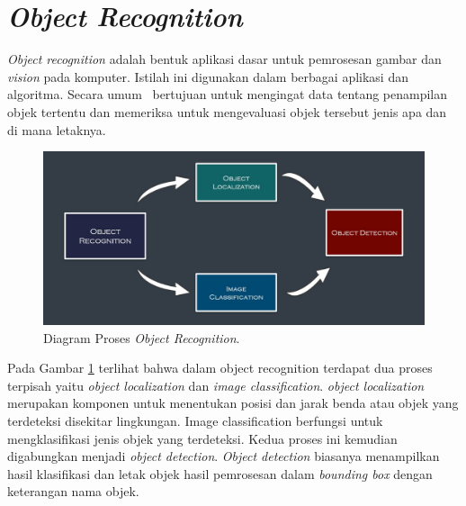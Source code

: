 
\section{\textit{Object Recognition}}
\label{sec:object_detection} 

\textit{Object recognition} adalah bentuk aplikasi dasar untuk pemrosesan gambar dan \textit{vision} pada komputer. Istilah ini digunakan dalam berbagai aplikasi dan algoritma. Secara umum \objd\ bertujuan untuk mengingat data tentang penampilan objek tertentu dan memeriksa untuk mengevaluasi objek tersebut jenis apa dan di mana letaknya. 

\begin{figure}[H]
            \centering
            \includegraphics[scale=0.3]{Object_Rec.jpeg}
            \caption{Diagram Proses \textit{Object Recognition}.}
            \label{fig:Ch02_objectR}
        \end{figure}

Pada Gambar \ref{fig:Ch02_objectR} terlihat bahwa dalam object recognition terdapat dua proses terpisah yaitu \textit{object localization} dan \textit{image classification}. \textit{object localization} merupakan komponen untuk menentukan posisi dan jarak benda atau objek yang terdeteksi disekitar lingkungan. Image classification berfungsi untuk mengklasifikasi jenis objek yang terdeteksi. Kedua proses ini kemudian digabungkan menjadi \textit{object detection}. \textit{Object detection} biasanya menampilkan hasil klasifikasi dan letak objek hasil pemrosesan dalam \textit{bounding box} dengan keterangan nama objek. 

